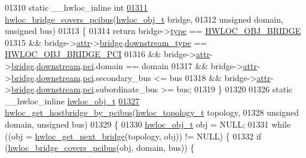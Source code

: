 \begin{DoxyCode}
{{{{01310 \textcolor{keyword}{static} \_\_hwloc\_inline \textcolor{keywordtype}{int}
\hypertarget{a00031_source_l01311}{}\hyperlink{a00064_gaef22d6bf5cb0b7f13a863780126a8cb7}{01311} \hyperlink{a00064_gaef22d6bf5cb0b7f13a863780126a8cb7}{hwloc_bridge_covers_pcibus}(\hyperlink{a00016}{hwloc_obj_t} bridge,
01312                            \textcolor{keywordtype}{unsigned} domain, \textcolor{keywordtype}{unsigned} bus)
01313 \{
01314   \textcolor{keywordflow}{return} bridge->\hyperlink{a00016_acc4f0803f244867e68fe0036800be5de}{type} == \hyperlink{a00041_ggacd37bb612667dc437d66bfb175a8dc55a6825f10895fea60aca7a6ba9fe273db0}{HWLOC_OBJ_BRIDGE}
01315     && bridge->\hyperlink{a00016_accd40e29f71f19e88db62ea3df02adc8}{attr}->\hyperlink{a00017_adbdf280699dd84c7619cd8d9edc0d958}{bridge}.\hyperlink{a00012_ac6a169b672d0e9f75756fd5665828b93}{downstream_type} == \hyperlink{a00041_gga48a4803c72574191d7ead1c62aaf9860a8f3b4cecf3dab6073d74696d10863c60}{HWLOC_OBJ_BRIDGE_PCI}
01316     && bridge->\hyperlink{a00016_accd40e29f71f19e88db62ea3df02adc8}{attr}->\hyperlink{a00017_adbdf280699dd84c7619cd8d9edc0d958}{bridge}.\hyperlink{a00012_acaf1ae02e37182bbb6966f8c4f35e499}{downstream}.\hyperlink{a00012_ab5c564e7c95b747dae9eb84ec0a2c31e}{pci}.domain == domain
01317     && bridge->\hyperlink{a00016_accd40e29f71f19e88db62ea3df02adc8}{attr}->\hyperlink{a00017_adbdf280699dd84c7619cd8d9edc0d958}{bridge}.\hyperlink{a00012_acaf1ae02e37182bbb6966f8c4f35e499}{downstream}.\hyperlink{a00012_ab5c564e7c95b747dae9eb84ec0a2c31e}{pci}.secondary\_bus <= bus
01318     && bridge->\hyperlink{a00016_accd40e29f71f19e88db62ea3df02adc8}{attr}->\hyperlink{a00017_adbdf280699dd84c7619cd8d9edc0d958}{bridge}.\hyperlink{a00012_acaf1ae02e37182bbb6966f8c4f35e499}{downstream}.\hyperlink{a00012_ab5c564e7c95b747dae9eb84ec0a2c31e}{pci}.subordinate\_bus >= bus;
01319 \}
01320 
01326 \textcolor{keyword}{static} \_\_hwloc\_inline \hyperlink{a00016}{hwloc_obj_t}
\hypertarget{a00031_source_l01327}{}\hyperlink{a00064_ga81d4f68afbd68d94eb70d4f5c603eff5}{01327} \hyperlink{a00064_ga81d4f68afbd68d94eb70d4f5c603eff5}{hwloc_get_hostbridge_by_pcibus}(\hyperlink{a00039_ga9d1e76ee15a7dee158b786c30b6a6e38}{hwloc_topology_t} topology,
01328                                \textcolor{keywordtype}{unsigned} domain, \textcolor{keywordtype}{unsigned} bus)
01329 \{
01330   \hyperlink{a00016}{hwloc_obj_t} obj = NULL;
01331   \textcolor{keywordflow}{while} ((obj = \hyperlink{a00064_ga2bd3f856d0fc3c6c02642c17d763b823}{hwloc_get_next_bridge}(topology, obj)) != NULL) \{
01332     \textcolor{keywordflow}{if} (\hyperlink{a00064_gaef22d6bf5cb0b7f13a863780126a8cb7}{hwloc_bridge_covers_pcibus}(obj, domain, bus)) \{
}}}}
\end{DoxyCode}
